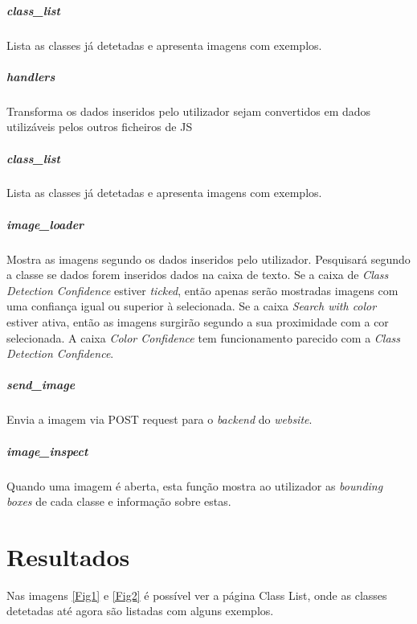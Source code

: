 \documentclass{report}
\begin{document}
\paragraph{class\_list}  Lista as classes já detetadas e apresenta imagens com exemplos.
\paragraph{handlers} Transforma os dados inseridos pelo utilizador sejam convertidos em dados utilizáveis pelos outros ficheiros de \ac{JS}
\paragraph{class\_list}  Lista as classes já detetadas e apresenta imagens com exemplos.
\paragraph{image\_loader}Mostra as imagens segundo os dados inseridos pelo utilizador. 
Pesquisará segundo a classe se dados forem inseridos dados na caixa de texto. 
Se a caixa de \textit{Class Detection Confidence} estiver \textit{ticked}, então 
apenas serão mostradas imagens com uma confiança igual ou superior à selecionada. 
Se a caixa \textit{Search with color} estiver ativa, então as imagens surgirão segundo a 
sua proximidade com a cor selecionada. A caixa \textit{Color Confidence} tem funcionamento 
parecido com a \textit{Class Detection Confidence}. 
\paragraph{send\_image} Envia a imagem via POST request para o \textit{backend} do \textit{website}.
\paragraph{image\_inspect} Quando uma imagem é aberta, esta função mostra ao utilizador as \textit{bounding boxes} de cada classe e informação sobre estas. 


\chapter{Resultados}
\label{chap.resultados}
Nas imagens \ref{Fig1} e \ref{Fig2} é possível ver a página Class List, onde as classes detetadas até agora são listadas com alguns exemplos. 
\end{document}
